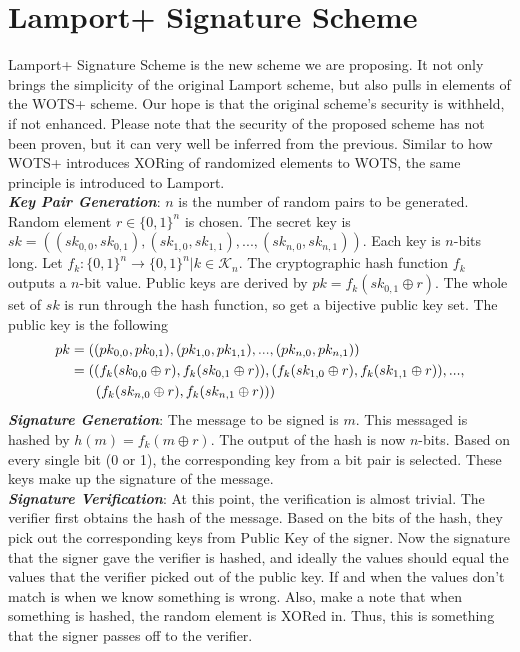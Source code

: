 \documentclass[]{scrartcl}
\makeatletter
\newcommand{\mathleft}{\@fleqntrue\@mathmargin0pt}
\makeatother
\begin{document}
\section*{Lamport+ Signature Scheme}
Lamport+ Signature Scheme is the new scheme we are proposing. It not only brings the simplicity of the original Lamport scheme, but also pulls in elements of the WOTS+ scheme. Our hope is that the original scheme's security is withheld, if not enhanced. Please note that the security of the proposed scheme has not been proven, but it can very well be inferred from the previous. Similar to how WOTS+ introduces XORing of randomized elements to WOTS, the same principle is introduced to Lamport.\\
\textbf{\textit{Key Pair Generation}}: $n$ is the number of random pairs to be generated. Random element $r \in \{0,1\}^n$ is chosen. The secret key is $sk = ((sk_{0,0}, sk_{0,1}),(sk_{1,0}, sk_{1,1}),...,(sk_{n,0}, sk_{n,1}))$. Each key is $n$-bits long. Let $f_k : \{0,1\}^n \rightarrow \{0,1\}^n | k \in \mathcal{K}_n$. The cryptographic hash function $f_k$ outputs a $n$-bit value. Public keys are derived by $pk = f_k(sk_{0,1} \oplus r)$. The whole set of $sk$ is run through the hash function, so get a bijective public key set. The public key is the following 
\mathleft
\begin{equation}
\begin{split}
pk & = ((pk_{0,0}, pk_{0,1}),(pk_{1,0}, pk_{1,1}),...,(pk_{n,0}, pk_{n,1})) \\
& = ((f_k(sk_{0,0} \oplus r), f_k(sk_{0,1}\oplus r)),(f_k(sk_{1,0} \oplus r), f_k(sk_{1,1}\oplus r)),...,\\
& \hspace{0.65cm}(f_k(sk_{n,0} \oplus r), f_k(sk_{n,1}\oplus r)))
\end{split}
\end{equation}
\textbf{\textit{Signature Generation}}: The message to be signed is $m$. This messaged is hashed by $h(m) = f_k(m \oplus r)$. The output of the hash is now $n$-bits. Based on every single bit (0 or 1), the corresponding key from a bit pair is selected. These keys make up the signature of the message.\\
\textbf{\textit{Signature Verification}}: At this point, the verification is almost trivial. The verifier first obtains the hash of the message. Based on the bits of the hash, they pick out the corresponding keys from Public Key of the signer. Now the signature that the signer gave the verifier is hashed, and ideally the values should equal the values that the verifier picked out of the public key. If and when the values don't match is when we know something is wrong. Also, make a note that when something is hashed, the random element is XORed in. Thus, this is something that the signer passes off to the verifier.
\end{document}
